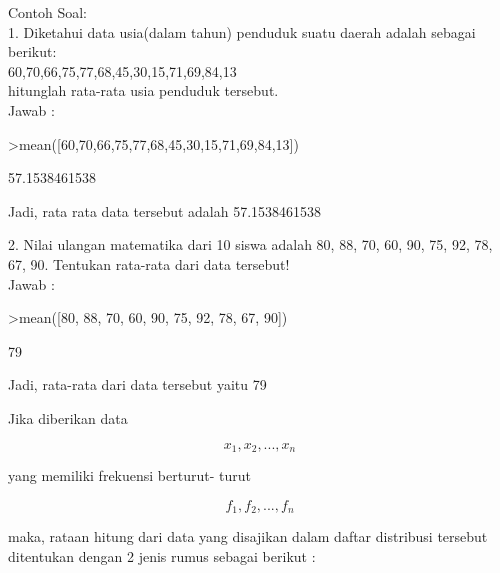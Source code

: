 \documentclass[a4paper,10pt]{article}
\begin{document}
\begin{eulernotebook}
\begin{eulercomment}
\begin{eulercomment}
\begin{eulercomment}
\begin{eulercomment}
\begin{eulercomment}
\begin{eulercomment}
\begin{eulercomment}
\begin{eulercomment}
\begin{eulercomment}
\begin{eulercomment}
\begin{eulercomment}
\begin{eulercomment}
\begin{eulercomment}
\begin{eulercomment}
\begin{eulercomment}
Contoh Soal:\\
1. Diketahui data usia(dalam tahun) penduduk suatu daerah adalah
sebagai berikut:\\
60,70,66,75,77,68,45,30,15,71,69,84,13\\
hitunglah rata-rata usia penduduk tersebut.\\
Jawab :
\end{eulercomment}
\begin{eulerprompt}
>mean([60,70,66,75,77,68,45,30,15,71,69,84,13])
\end{eulerprompt}
\begin{euleroutput}
  57.1538461538
\end{euleroutput}
\begin{eulercomment}
Jadi, rata rata data tersebut adalah 57.1538461538

2. Nilai ulangan matematika dari 10 siswa adalah 80, 88, 70, 60, 90,
75, 92, 78, 67, 90. Tentukan rata-rata dari data tersebut!\\
Jawab :
\end{eulercomment}
\begin{eulerprompt}
>mean([80, 88, 70, 60, 90, 75, 92, 78, 67, 90])
\end{eulerprompt}
\begin{euleroutput}
  79
\end{euleroutput}
\begin{eulercomment}
Jadi, rata-rata dari data tersebut yaitu 79

\end{eulercomment}
\begin{eulercomment}
Jika diberikan data\\
\end{eulercomment}
\begin{eulerformula}
\[
x_1,x_2,...,x_n
\]
\end{eulerformula}
\begin{eulercomment}
yang memiliki frekuensi berturut- turut\\
\end{eulercomment}
\begin{eulerformula}
\[
f_1,f_2,...,f_n
\]
\end{eulerformula}
\begin{eulercomment}
maka, rataan hitung dari data yang disajikan dalam daftar distribusi
tersebut ditentukan dengan 2 jenis rumus sebagai berikut :


\end{eulercomment}
\end{eulercomment}
\end{eulercomment}
\end{eulercomment}
\end{eulercomment}
\end{eulercomment}
\end{eulercomment}
\end{eulercomment}
\end{eulercomment}
\end{eulercomment}
\end{eulercomment}
\end{eulercomment}
\end{eulercomment}
\end{eulercomment}
\end{eulercomment}
\end{eulernotebook}
\end{document}
